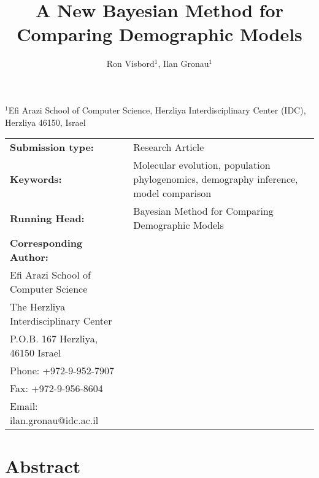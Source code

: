 \documentclass[11pt]{article}
\begin{document}
\begin{titlepage}

\title{A New Bayesian Method for Comparing Demographic Models}


\author{Ron Visbord$^1$, Ilan Gronau$^{1}$}

\maketitle

\begin{footnotesize}
\begin{center}
$^1$Efi Arazi School of Computer Science, Herzliya Interdisciplinary Center (IDC), Herzliya 46150, Israel
\end{center}
\end{footnotesize}

\vspace{1in}

\begin{tabular}{lp{4.5in}}
{\bf Submission type:}& Research Article
\vspace{1ex}\\
{\bf Keywords:}& 
Molecular evolution, population phylogenomics, demography inference, model comparison
\vspace{1ex}\\
{\bf Running Head:}&Bayesian Method for Comparing Demographic Models
\vspace{1ex}\\ 
{\bf Corresponding Author:}&
\begin{minipage}[t]{4in}
 Ilan Gronau\\
 Efi Arazi School of Computer Science\\
 The Herzliya Interdisciplinary Center\\
 P.O.B. 167 Herzliya, 46150 Israel\\
 Phone: +972-9-952-7907\\
 Fax: +972-9-956-8604\\
 Email: ilan.gronau@idc.ac.il
\end{minipage}
\end{tabular}

\thispagestyle{empty}
\end{titlepage}

\doublespacing

\section*{Abstract}
\end{document}
